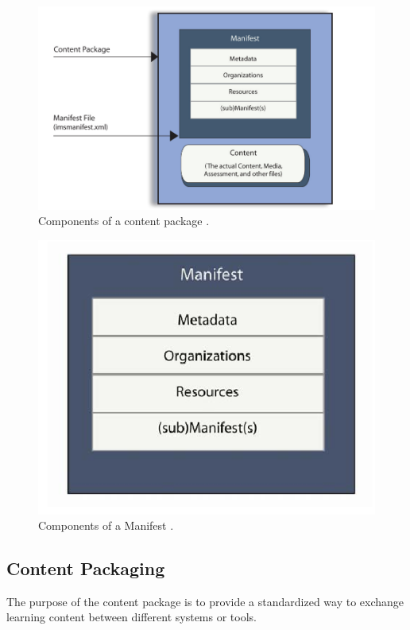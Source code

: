 \begin{figure}[t]
	\begin{center}
		\includegraphics[scale=0.4]{contentPackaging.png}
	\end{center}
	\caption{Components of a content package \cite{cambook}.}
	\label{fig:components_of_a_content_package}
\end{figure}
\begin{figure}[t]
	\begin{center}
		\includegraphics[scale=0.4]{manifest.png}
	\end{center}
	\caption{Components of a Manifest \cite{cambook}.}
	\label{fig:components_of_a_Manifest}
\end{figure}
\subsection{Content Packaging}
The purpose of the content package is to provide a standardized way to exchange learning content between different systems or tools.
